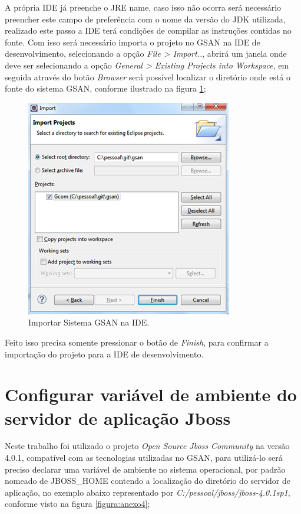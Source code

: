 \begin{anexosenv}
A própria IDE já preenche o JRE name, caso isso não ocorra será necessário preencher este campo de preferência com o nome da versão do JDK utilizada, realizado este passo a IDE terá condições de compilar as instruções contidas no fonte.  Com isso será necessário importa o projeto no GSAN na IDE de desenvolvimento, selecionando a opção \textit{File > Import..}, abrirá um janela onde deve ser selecionando a opção \textit{General > Existing Projects into Workspace}, em seguida através do botão \textit{Browser} será possível localizar o diretório onde está o fonte do sistema GSAN, conforme ilustrado na figura \ref{figura:anexo3};

\begin{figure}[H]
	\centering
	\caption{Importar Sistema GSAN na IDE.}
	\label{figura:anexo3}
	\includegraphics{figuras/anexo/importGSAN.png}
\end{figure}

Feito isso precisa somente pressionar o botão de \textit{Finish}, para confirmar a importação do projeto para a IDE de desenvolvimento.

\chapter{Configurar variável de ambiente do servidor de aplicação Jboss}

Neste trabalho foi utilizado o projeto \textit{Open Source Jboss Community} na versão 4.0.1, compatível com as tecnologias utilizadas no GSAN, para utilizá-lo será preciso declarar uma variável de ambiente no sistema operacional, por padrão nomeado de JBOSS\_HOME contendo a localização do diretório do servidor de aplicação, no exemplo abaixo representado por \textit{C:/pessoal/jboss/jboss-4.0.1sp1}, conforme visto na figura \ref{figura:anexo4};


\end{anexosenv}
